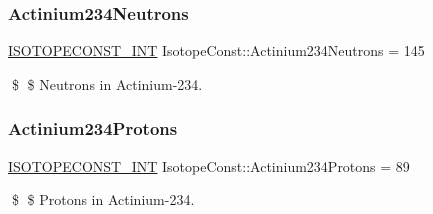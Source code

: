 \subsubsection{\texorpdfstring{Actinium234\+Neutrons}{Actinium234Neutrons}}
{\footnotesize\ttfamily \mbox{\hyperlink{group___isotope_const-_macros_ga5f18360b3e99483a35c32d789e62621c}{I\+S\+O\+T\+O\+P\+E\+C\+O\+N\+S\+T\+\_\+\+I\+NT}} Isotope\+Const\+::\+Actinium234\+Neutrons = 145}

\$ \$ Neutrons in Actinium-\/234. \mbox{\label{group___isotope_const-_actinium-_ac234_gadbe895f169810e8ddeda71336f72a9e7}} 
\subsubsection{\texorpdfstring{Actinium234\+Protons}{Actinium234Protons}}
{\footnotesize\ttfamily \mbox{\hyperlink{group___isotope_const-_macros_ga5f18360b3e99483a35c32d789e62621c}{I\+S\+O\+T\+O\+P\+E\+C\+O\+N\+S\+T\+\_\+\+I\+NT}} Isotope\+Const\+::\+Actinium234\+Protons = 89}

\$ \$ Protons in Actinium-\/234. 